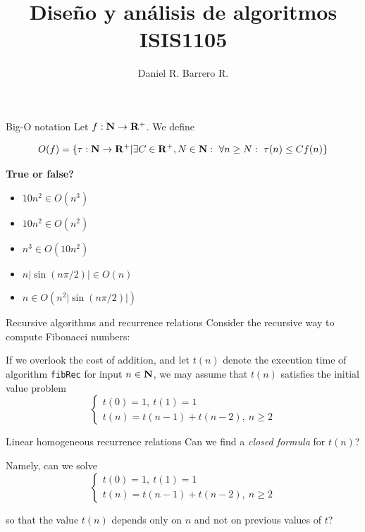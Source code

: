 \documentclass{beamer}
\title{Diseño y análisis de algoritmos \\ ISIS1105}
\author{Daniel R. Barrero R.}
\institute{Universidad de los Andes}
\begin{document}
\frame{\titlepage}

%

\begin{frame}{Big-O notation}
	Let $f : \mathbf{N} \to \mathbf{R}^+$. We define

	\begin{equation*}
		O(f) = \{\tau : \mathbf{N} \to \mathbf{R}^+ | \exists C \in \mathbf{R}^+, N \in \mathbf{N}:
		\ \forall n \geq N:\ \tau(n) \leq Cf(n)\}
	\end{equation*}

	\textbf{True or false?}
	\begin{itemize}
		\item $10n^2 \in O(n^3)$
		\item $10n^2 \in O(n^2)$
		\item $n^3 \in O(10n^2)$
		\item $n|\sin(n\pi/2)| \in O(n)$
		\item $n \in O(n^2|\sin(n\pi/2)|)$
	\end{itemize}
\end{frame}

%

\begin{frame}{Recursive algorithms and recurrence relations}
	Consider the recursive way to compute Fibonacci numbers:

	

	If we overlook the cost of addition, and let $t(n)$ denote the execution
	time of algorithm \texttt{fibRec} for input $n \in \mathbf{N}$, we may assume that
	$t(n)$ satisfies the initial value problem
	\begin{displaymath}
		\begin{cases}
			t(0)= 1,\ t(1)= 1 \\
			t(n)= t(n-1) + t(n-2),\ n \geq 2
		\end{cases}
	\end{displaymath}
\end{frame}

%

\begin{frame}{Linear homogeneous recurrence relations}
	Can we find a \emph{closed formula} for $t(n)$?

	\bigskip
	Namely, can we solve
	\begin{displaymath}
		\begin{cases}
			t(0)= 1,\ t(1)= 1 \\
			t(n)= t(n-1) + t(n-2),\ n \geq 2
		\end{cases}
	\end{displaymath}

	so that the value $t(n)$ depends only on $n$ and not on previous values
	of $t$?
\end{frame}
\end{document}
